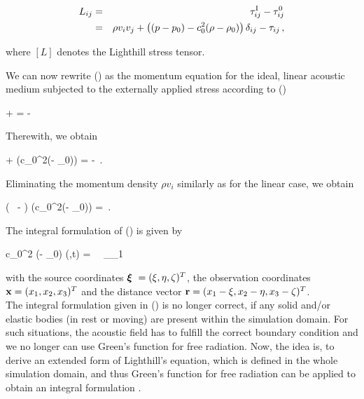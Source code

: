 \documentclass[a4paper,10pt]{article}
\begin{document}
\begin{eqnarray}
\label{eq:Lt1}
L_{ij} &=& \tau^{\rm I}_{ij} - \tau_{ij}^0 \nonumber \\
&=& \rho v_i v_j + \left( (p-p_0) - c_0^2 (\rho - \rho_0)\right) \delta_{ij} - \tau_{ij}\,,
\end{eqnarray}

\noindent
where $[L]$ denotes the {Lighthill stress tensor}.

We can  now rewrite  () as the  momentum equation  for the
ideal, linear  acoustic medium subjected to the  externally applied stress
according to ()

 +  =
- 
\ee

\noindent
Therewith, we obtain

 +  \left(c_0^2(\rho - \rho_0)\right)
= - \,.
\ee

\noindent
Eliminating the  momentum density $\rho  v_i$ similarly as for  the linear
case, we obtain

\left(  \,   -  \right) (c_0^2(\rho - \rho_0)) 
= \,.
\ee

\noindent
The integral formulation of () is given by

c_0^2 (\rho - \rho_0) (\bx,t) =  \, 
\, \int\limits_{\Omega_1}\, \, \rd\xi \rd\eta \rd\zeta
\ee

\noindent
with the source coordinates ${\mbox{\boldmath $\xi$ }} = (\xi, \eta, \zeta)^T$, the observation
coordinates  ${\bf x} =  (x_1,x_2,  x_3)^T$  and the  distance  vector ${\bf r}  =
(x_1-\xi, x_2-\eta, x_3-\zeta)^T$.\\

The integral formulation given in () is no longer correct, if any
solid and/or  elastic bodies  (in rest or  moving) are present  within the
simulation domain. For such situations,  the acoustic field has to fulfill
the correct boundary  condition and we no longer  can use Green's function
for  free radiation.   Now, the  idea is,  to derive  an extended  form of
Lighthill's equation, which is defined in the whole simulation domain, and
thus  Green's function  for free  radiation can  be applied  to  obtain an
integral formulation \cite{Ffowcs-Williams1969}.
\end{document}
